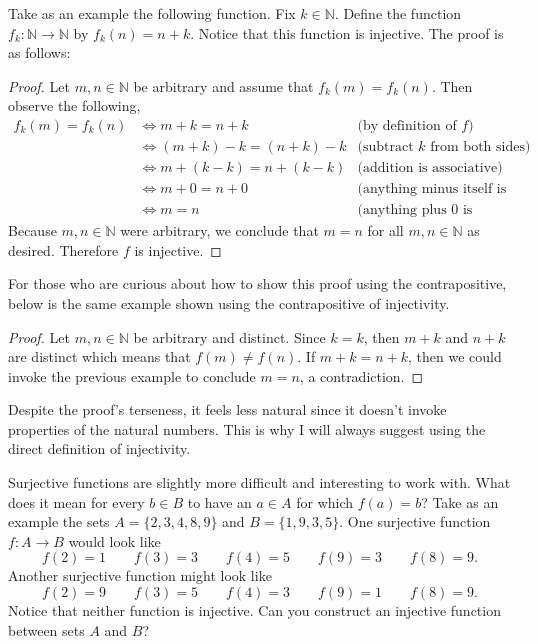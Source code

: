 \documentclass[12pt]{book}
\def\N{{\mathbb{N}}}
\begin{document}
Take as an example the following function. Fix $k\in\N$. Define the function $f_k\colon\N\rightarrow\N$ by $f_k(n)=n+k$. Notice that this function is injective. The proof is as follows:
\begin{proof}
Let $m,n\in\N$ be arbitrary and assume that $f_k(m)=f_k(n)$. Then observe the following,
\begin{align*}
	f_k(m)=f_k(n) & \Leftrightarrow m+k=n+k & \text{(by definition of $f$)}\\
	 & \Leftrightarrow (m+k)-k=(n+k)-k & \text{(subtract $k$ from both sides)}\\
	 & \Leftrightarrow m+(k-k)=n+(k-k) & \text{(addition is associative)}\\
	 & \Leftrightarrow m+0 = n+0 & \text{(anything minus itself is 0)}\\
	 & \Leftrightarrow m=n & \text{(anything plus 0 is itself)}
\end{align*}
Because $m,n\in\N$ were arbitrary, we conclude that $m=n$ for all $m,n\in\N$ as desired. Therefore $f$ is injective.
\end{proof}

For those who are curious about how to show this proof using the contrapositive, below is the same example shown using the contrapositive of injectivity.
\begin{proof}
Let $m,n\in\N$ be arbitrary and distinct. Since $k=k$, then $m+k$ and $n+k$ are distinct which means that $f(m)\neq f(n)$. If $m+k=n+k$, then we could invoke the previous example to conclude $m=n$, a contradiction.
\end{proof}
Despite the proof's terseness, it feels less natural since it doesn't invoke properties of the natural numbers. This is why I will always suggest using the direct definition of injectivity. 


Surjective functions are slightly more difficult and interesting to work with. What does it mean for every $b\in B$ to have an $a\in A$ for which $f(a)=b$? Take as an example the sets $A=\{2,3,4,8,9\}$ and $B=\{1,9,3,5\}$. One surjective function $f\colon A\rightarrow B$ would look like
\[f(2)=1\qquad f(3)=3\qquad f(4)=5\qquad f(9)=3\qquad f(8)=9.\]
Another surjective function might look like
\[f(2)=9\qquad f(3)=5\qquad f(4)=3\qquad f(9)=1\qquad f(8)=9.\]
Notice that neither function is injective. Can you construct an injective function between sets $A$ and $B$?
\end{document}
